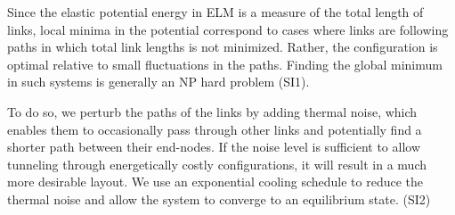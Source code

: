 Since the elastic potential energy in ELM is a measure of the total length of links, local minima in the potential correspond to cases where links are following paths in which total link lengths is not minimized. 
Rather, the configuration is optimal relative to small fluctuations in the paths. 
Finding the global minimum in such systems is generally an NP hard problem (SI1).


To do so, we perturb the paths of the links by adding thermal noise, which enables them to occasionally pass through other links and potentially find a shorter path between their end-nodes.
If the noise level is sufficient to allow tunneling through energetically costly configurations, it will result in a much more desirable layout.
We use an exponential cooling schedule to reduce the thermal noise and allow the system to converge to an equilibrium state. (SI2)

